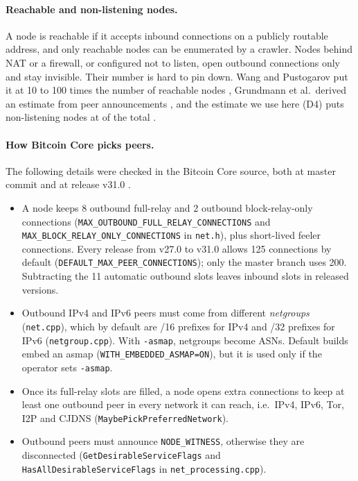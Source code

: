 \documentclass[10pt,a4paper]{article}
\begin{document}
\paragraph{Reachable and non-listening nodes.} A node is reachable if it accepts inbound connections on a publicly routable address, and only reachable nodes can be enumerated by a crawler. Nodes behind NAT or a firewall, or configured not to listen, open outbound connections only and stay invisible. Their number is hard to pin down. Wang and Pustogarov put it at 10 to 100 times the number of reachable nodes \cite{wang2017unreachable}, Grundmann et al.\ derived an estimate from peer announcements \cite{grundmann2022size}, and the estimate we use here (D4) puts non-listening nodes at \LukeUnreachShare{} of the total \cite{lukedashjr}.

\paragraph{How Bitcoin Core picks peers.} The following details were checked in the Bitcoin Core source, both at master commit \texttt{\CoreCommit} and at release v31.0 \cite{bitcoincore}.
\begin{itemize}
\item A node keeps 8 outbound full-relay and 2 outbound block-relay-only connections (\texttt{MAX\_\allowbreak{}OUTBOUND\_\allowbreak{}FULL\_\allowbreak{}RELAY\_\allowbreak{}CONNECTIONS} and \texttt{MAX\_\allowbreak{}BLOCK\_\allowbreak{}RELAY\_\allowbreak{}ONLY\_\allowbreak{}CONNECTIONS} in \texttt{net.h}), plus short-lived feeler connections. Every release from v27.0 to v31.0 allows 125 connections by default (\texttt{DEFAULT\_\allowbreak{}MAX\_\allowbreak{}PEER\_\allowbreak{}CONNECTIONS}); only the master branch uses 200. Subtracting the 11 automatic outbound slots leaves \InboundCap{} inbound slots in released versions.
\item Outbound IPv4 and IPv6 peers must come from different \emph{netgroups} (\texttt{net.cpp}), which by default are /16 prefixes for IPv4 and /32 prefixes for IPv6 (\texttt{netgroup.cpp}). With \texttt{-asmap}, netgroups become ASNs. Default builds embed an asmap (\texttt{WITH\_\allowbreak{}EMBEDDED\_\allowbreak{}ASMAP=ON}), but it is used only if the operator sets \texttt{-asmap}.
\item Once its full-relay slots are filled, a node opens extra connections to keep at least one outbound peer in every network it can reach, i.e.\ IPv4, IPv6, Tor, I2P and CJDNS (\texttt{MaybePickPreferredNetwork}).
\item Outbound peers must announce \texttt{NODE\_\allowbreak{}WITNESS}, otherwise they are disconnected (\texttt{Get\allowbreak{}Desirable\allowbreak{}Service\allowbreak{}Flags} and \texttt{Has\allowbreak{}All\allowbreak{}Desirable\allowbreak{}Service\allowbreak{}Flags} in \texttt{net\_\allowbreak{}processing.cpp}).
\end{itemize}
\end{document}
